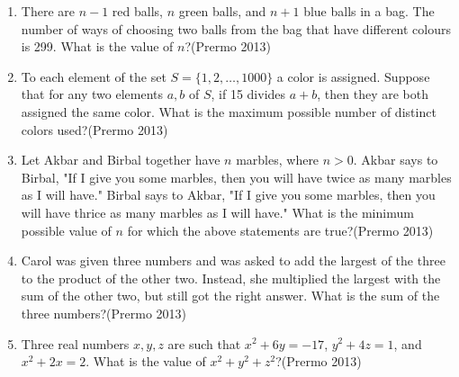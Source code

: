 \begin{enumerate}
\item There are $ n-1 $ red balls, $ n $ green balls, and $ n+1 $ blue balls in a bag. The number of ways of choosing two balls from the bag that have different colours is 299. What is the value of $ n $?\hfill(Prermo 2013)

\item To each element of the set $ S = \{1, 2, \dots, 1000\} $ a color is assigned. Suppose that for any two elements $ a, b $ of $ S $, if 15 divides $ a + b $, then they are both assigned the same color. What is the maximum possible number of distinct colors used?\hfill(Prermo 2013)
\item Let Akbar and Birbal together have $ n $ marbles, where $ n > 0 $. Akbar says to Birbal, "If I give you some marbles, then you will have twice as many marbles as I will have." Birbal says to Akbar, "If I give you some marbles, then you will have thrice as many marbles as I will have." What is the minimum possible value of $ n $ for which the above statements are true?\hfill(Prermo 2013)

\item Carol was given three numbers and was asked to add the largest of the three to the product of the other two. Instead, she multiplied the largest with the sum of the other two, but still got the right answer. What is the sum of the three numbers?\hfill(Prermo 2013)

\item Three real numbers $ x, y, z $ are such that
$ x^2 + 6y = -17 $, $ y^2 + 4z = 1 $, and $ x^2 + 2x = 2 $. What is the value of $ x^2 + y^2 + z^2 $?\hfill(Prermo 2013)


\end{enumerate}

